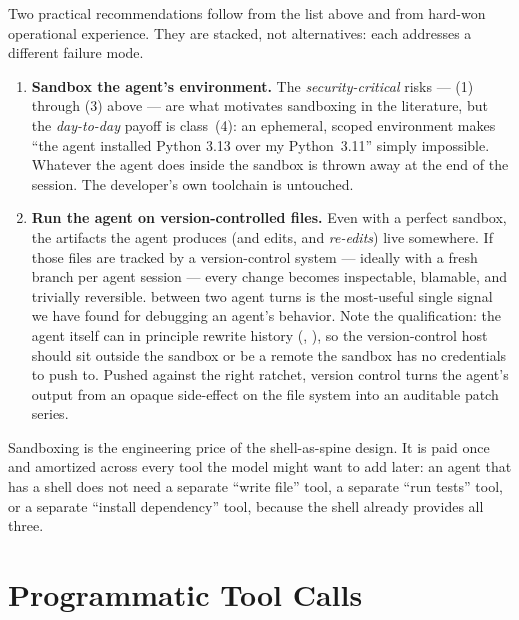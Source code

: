 \noindent
Two practical recommendations follow from the list above and from
hard-won operational experience. They are stacked, not alternatives:
each addresses a different failure mode.

\begin{enumerate}[label=\textbf{(\arabic*)},leftmargin=2.2em,itemsep=0.4em]

\item \textbf{Sandbox the agent's environment.} The
  \emph{security-critical} risks --- (1) through (3) above --- are
  what motivates sandboxing in the literature, but the
  \emph{day-to-day} payoff is class~(4): an ephemeral, scoped
  environment makes ``the agent installed Python 3.13 over my
  Python~3.11'' simply impossible. Whatever the agent does inside
  the sandbox is thrown away at the end of the session. The
  developer's own toolchain is untouched.

\item \textbf{Run the agent on version-controlled files.} Even with
  a perfect sandbox, the artifacts the agent produces (and edits,
  and \emph{re-edits}) live somewhere. If those files are tracked by
  a version-control system --- ideally with a fresh branch per agent
  session --- every change becomes inspectable, blamable, and
  trivially reversible.  between two agent turns is
  the most-useful single signal we have found for debugging an
  agent's behavior. Note the qualification: the agent itself can in
  principle rewrite history (,
  ), so the version-control host should sit
  outside the sandbox or be a remote the sandbox has no credentials
  to push to. Pushed against the right ratchet, version control
  turns the agent's output from an opaque side-effect on the file
  system into an auditable patch series.

\end{enumerate}

\noindent
Sandboxing is the engineering price of the shell-as-spine design. It
is paid once and amortized across every tool the model might want to
add later: an agent that has a shell does not need a separate
``write file'' tool, a separate ``run tests'' tool, or a separate
``install dependency'' tool, because the shell already provides all
three.

\section{Programmatic Tool Calls}
\label{sec:codeact}

